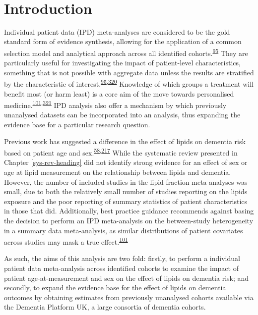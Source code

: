 \documentclass[a4paper, twoside]{templates/ociamthesis}
\begin{document}
~

\hypertarget{introduction-3}{%
\section{Introduction}\label{introduction-3}}

Individual patient data (IPD) meta-analyses are considered to be the gold standard form of evidence synthesis, allowing for the application of a common selection model and analytical approach across all identified cohorts.\textsuperscript{\protect\hyperlink{ref-riley2010}{95}} They are particularly useful for investigating the impact of patient-level characteristics, something that is not possible with aggregate data unless the results are stratified by the characteristic of interest.\textsuperscript{\protect\hyperlink{ref-riley2010}{95},\protect\hyperlink{ref-thompson2005}{320}} Knowledge of which groups a treatment will benefit most (or harm least) is a core aim of the move towards personalised medicine.\textsuperscript{\protect\hyperlink{ref-riley2020}{101},\protect\hyperlink{ref-hingorani2013}{321}}
IPD analysis also offer a mechanism by which previously unanalysed datasets can be incorporated into an analysis, thus expanding the evidence base for a particular research question.

Previous work has suggested a difference in the effect of lipids on dementia risk based on patient age and sex.\textsuperscript{\protect\hyperlink{ref-mielke2010}{58},\protect\hyperlink{ref-ancelin2013}{217}} While the systematic review presented in Chapter \ref{sys-rev-heading} did not identify strong evidence for an effect of sex or age at lipid measurement on the relationship between lipids and dementia. However, the number of included studies in the lipid fraction meta-analyses was small, due to both the relatively small number of studies reporting on the lipids exposure and the poor reporting of summary statistics of patient characteristics in those that did. Additionally, best practice guidance recommends against basing the decision to perform an IPD meta-analysis on the between-study heterogeneity in a summary data meta-analysis, as similar distributions of patient covariates across studies may mask a true effect.\textsuperscript{\protect\hyperlink{ref-riley2020}{101}}

As such, the aims of this analysis are two fold: firstly, to perform a individual patient data meta-analysis across identified cohorts to examine the impact of patient age-at-measurement and sex on the effect of lipids on dementia risk; and secondly, to expand the evidence base for the effect of lipids on dementia outcomes by obtaining estimates from previously unanalysed cohorts available via the Dementia Platform UK, a large consortia of dementia cohorts.
\end{document}
